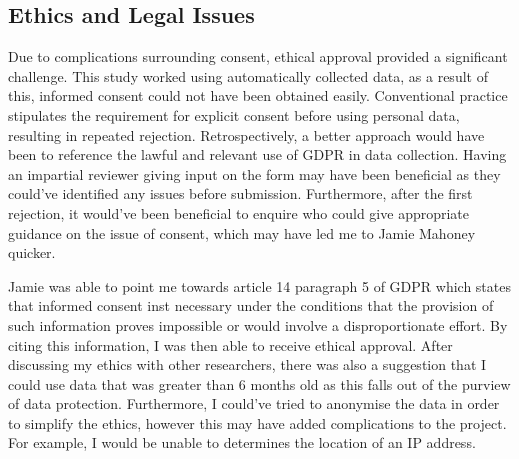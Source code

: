 \subsection{Ethics and Legal Issues}

Due to complications surrounding consent, ethical approval provided a significant challenge. This study worked using automatically collected data, as a result of this, informed consent could not have been obtained easily. Conventional practice stipulates the requirement for explicit consent before using personal data, resulting in repeated rejection. Retrospectively, a better approach would have been to reference the lawful and relevant use of GDPR in data collection. Having an impartial reviewer giving input on the form may have been beneficial as they could've identified any issues before submission. Furthermore, after the first rejection, it would've been beneficial to enquire who could give appropriate guidance on the issue of consent, which may have led me to Jamie Mahoney quicker. 

Jamie was able to point me towards article 14 paragraph 5 of GDPR which states that informed consent inst necessary under the conditions that the provision of such information proves impossible or would involve a disproportionate effort. By citing this information, I was then able to receive ethical approval. After discussing my ethics with other researchers, there was also a suggestion that I could use data that was greater than 6 months old as this falls out of the purview of data protection. Furthermore, I could've tried to anonymise the data in order to simplify the ethics, however this may have added complications to the project. For example, I would be unable to determines the location of an IP address.